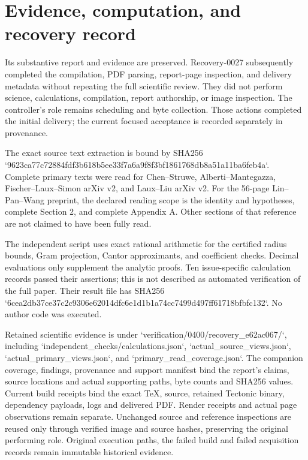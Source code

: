 \documentclass[10pt]{article}
\begin{document}
\section*{Evidence, computation, and recovery record}
Its substantive report and evidence are preserved. Recovery-0027 subsequently completed the compilation, PDF parsing, report-page inspection, and delivery metadata without repeating the full scientific review. They did not perform science, calculations, compilation, report authorship, or image inspection. The controller’s role remains scheduling and byte collection. Those actions completed the initial delivery; the current focused acceptance is recorded separately in provenance.\par
The exact source text extraction is bound by SHA256 `9623ca77c72884fdf3b618b5ee33f7a6a9f8f3bf1861768db8a51a11ba6feb4a`. Complete primary texts were read for Chen–Struwe, Alberti–Mantegazza, Fischer–Laux–Simon arXiv v2, and Laux–Liu arXiv v2. For the 56-page Lin–Pan–Wang preprint, the declared reading scope is the identity and hypotheses, complete Section 2, and complete Appendix A. Other sections of that reference are not claimed to have been fully read.\par
The independent script uses exact rational arithmetic for the certified radius bounds, Gram projection, Cantor approximants, and coefficient checks. Decimal evaluations only supplement the analytic proofs. Ten issue-specific calculation records passed their assertions; this is not described as automated verification of the full paper. Their result file has SHA256 `6cea2db37ce37c2c9306e62014dfc6e1d1b1a74cc7499d497ff61718bfbfc132`. No author code was executed.\par
Retained scientific evidence is under `verification/0400/recovery\_e62ac067/`, including `independent\_checks/calculations.json`, `actual\_source\_views.json`, `actual\_primary\_views.json`, and `primary\_read\_coverage.json`. The companion coverage, findings, provenance and support manifest bind the report’s claims, source locations and actual supporting paths, byte counts and SHA256 values. Current build receipts bind the exact TeX, source, retained Tectonic binary, dependency payloads, logs and delivered PDF. Render receipts and actual page observations remain separate. Unchanged source and reference inspections are reused only through verified image and source hashes, preserving the original performing role. Original execution paths, the failed build and failed acquisition records remain immutable historical evidence.\par
\end{document}
